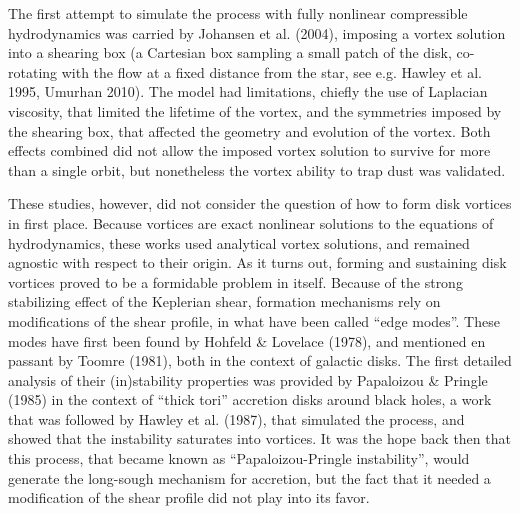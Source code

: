 \documentclass[apj]{emulateapj}
\begin{document}
The first attempt to simulate the process with
fully nonlinear compressible hydrodynamics was carried by Johansen et
al. (2004), imposing a vortex solution into a  shearing box (a Cartesian box sampling a small
patch of the disk, co-rotating with the flow at a fixed distance from
the star, see e.g. Hawley et al. 1995, Umurhan 2010). The model had limitations, chiefly the use of Laplacian
viscosity, that limited the lifetime of the vortex, and the symmetries
imposed by the shearing box, that affected the geometry and evolution
of the vortex.  Both effects combined did not allow the
imposed vortex solution to survive for more than a single orbit, but
nonetheless the vortex ability to trap dust was validated. 

These studies, however, did not consider the question of how to
form disk vortices in first place. Because vortices are exact nonlinear solutions to the equations of
hydrodynamics, these works used analytical vortex solutions, and remained
agnostic with respect to their origin. As it turns out, forming and
sustaining disk vortices proved to be a formidable problem in
itself. Because of the strong stabilizing effect of the Keplerian
shear, formation mechanisms rely on modifications of the shear
profile, in what have been called ``edge modes''. These modes have
first been found by Hohfeld \& Lovelace (1978), and mentioned en
passant by Toomre (1981), both in the context of galactic disks. The first detailed analysis of their
(in)stability properties was provided by Papaloizou \& Pringle (1985) in the
context of ``thick tori'' accretion disks around
black holes, a work that was followed by Hawley et al. (1987), that
simulated the process, and showed that the instability saturates into
vortices. It was the hope back then that this process, that became
known as ``Papaloizou-Pringle instability'', would generate the
long-sough mechanism for accretion, but the fact that it needed a
modification of the shear profile did not play into its favor. 
\end{document}
